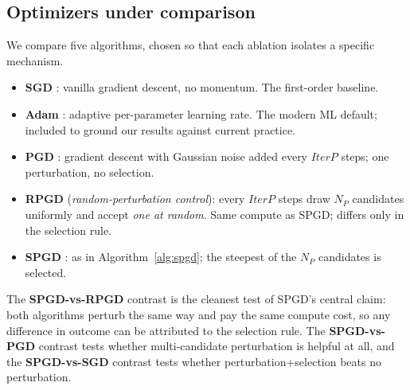\documentclass[11pt]{article}
\newcommand{\np}{\ensuremath{N_P}}
\newcommand{\iterp}{\ensuremath{\textit{IterP}}}
\begin{document}
\subsection{Optimizers under comparison}
\label{sec:optimizers}
We compare five algorithms, chosen so that each ablation isolates a
specific mechanism.

\begin{itemize}[leftmargin=*,itemsep=2pt,topsep=2pt]
  \item \textbf{SGD} \citep{robbins1951stochastic}: vanilla gradient
        descent, no momentum. The first-order baseline.
  \item \textbf{Adam} \citep{kingma2015adam}: adaptive per-parameter
        learning rate. The modern ML default; included to ground our
        results against current practice.
  \item \textbf{PGD} \citep{jin2017escape}: gradient descent with
        Gaussian noise added every \iterp{} steps; one perturbation,
        no selection.
  \item \textbf{RPGD} (\emph{random-perturbation control}): every
        \iterp{} steps draw \np{} candidates uniformly and accept
        \emph{one at random}. Same compute as SPGD; differs only in
        the selection rule.
  \item \textbf{SPGD} \citep{vahedi2024spgd}: as in
        Algorithm~\ref{alg:spgd}; the steepest of the \np{} candidates
        is selected.
\end{itemize}

\noindent The \textbf{SPGD-vs-RPGD} contrast is the cleanest test of
SPGD's central claim: both algorithms perturb the same way and pay the
same compute cost, so any difference in outcome can be attributed to
the selection rule. The \textbf{SPGD-vs-PGD} contrast tests whether
multi-candidate perturbation is helpful at all, and the
\textbf{SPGD-vs-SGD} contrast tests whether perturbation+selection
beats no perturbation.
\end{document}
